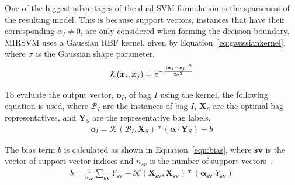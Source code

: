 \documentclass[reqno]{vcuthesis}
\newcommand{\norm}[1]{{||#1||}}
\newcommand{\spa}[1]{\mathcal{#1}}
\numberwithin{equation}{chapter}
\begin{document}
One of the biggest advantages of the dual SVM formulation is the sparseness of the resulting model. This is because support vectors, instances that have their corresponding $\alpha_I \neq 0$, are only considered when forming the decision boundary. MIRSVM uses a Gaussian RBF kernel, given by Equation~\eqref{eq:gaussiankernel}, where $\sigma$ is the Gaussian shape parameter.
\begin{equation}
\label{eq:gaussiankernel}
\centering
\mathcal{K}(\bm x_i, \bm x_j) = e^{-\frac{\norm{\bm x_i - \bm x_j}^2}{2\sigma^2}}
\end{equation}

To evaluate the output vector, $\bm o_I$, of bag $I$ using the kernel, the following equation is used, where $\mathcal{B}_I$ are the instances of bag $I$, $\bm X_S$ are the optimal bag representatives, and $\bm Y_S$ are the representative bag labels.
\begin{align}
\bm o_I = \spa{K}(\mathcal{B}_I,\bm X_S)*(\bm\alpha \cdot \bm Y_S) + b
\end{align}

\newpage

The bias term $b$ is calculated as shown in Equation~\eqref{eqn:bias}, where $\bm{sv}$ is the vector of support vector indices and $n_{sv}$ is the number of support vectors~\cite{Huang2006}.
\begin{align}
\label{eqn:bias}
b = \frac{1}{n_{\bm{sv}}}\sum_{\bm{sv}} Y_{\bm{sv}} - \spa{K}(\bm X_{\bm{sv}},\bm X_{\bm{sv}})*(\bm \alpha_{\bm{sv}}\bm\cdot Y_{\bm{sv}})
\end{align}
\end{document}
